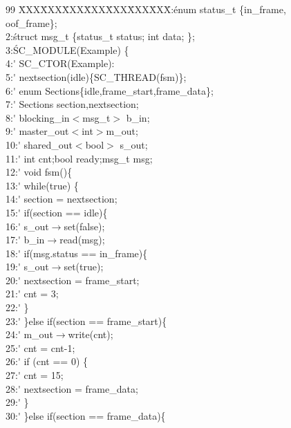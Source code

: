 \begin{figure}
  \centering  
  \begin{minipage}{0.9\linewidth}
    \sffamily\small
    \begin{tabbing}
99 \= XXX\=XXX\=XXX\=XXX\=XXX\=XXX\=XXX\=:\' enum status\_t \{in\_frame, oof\_frame\};\\
2:\' struct msg\_t \{status\_t status; int data; \};\\
3:\' SC\_MODULE(Example) \{ \\
4:\'\> SC\_CTOR(Example): \\
5:\'\>\> nextsection(idle)\{SC\_THREAD(fsm)\}; \\
6:\'\> enum Sections\{idle,frame\_start,frame\_data\}; \\
7:\'\> Sections section,nextsection; \\
8:\'\> blocking\_in$<$msg\_t$>$ b\_in; \\
9:\'\> master\_out$<$int$>$m\_out; \\
10:\'\> shared\_out$<$bool$>$ s\_out; \\
11:\'\> int cnt;bool ready;msg\_t msg; \\
12:\'\> void fsm()\{ \\
13:\'\>\> while(true) \{ \\
14:\'\>\>\> section = nextsection; \\
15:\'\>\>\> if(section == idle)\{ \\
16:\'\>\>\>\> s\_out$\rightarrow$set(false); \\
17:\'\>\>\>\> b\_in$\rightarrow$read(msg);\\
18:\'\>\>\>\> if(msg.status == in\_frame)\{\\
19:\'\>\>\>\>\> s\_out$\rightarrow$set(true); \\
20:\'\>\>\>\>\> nextsection = frame\_start;\\
21:\'\>\>\>\>\> cnt = 3;\\
22:\'\>\>\>\> \}\\
23:\'\>\>\> \}else if(section == frame\_start)\{ \\
24:\'\>\>\>\> m\_out$\rightarrow$write(cnt);\\
25:\'\>\>\>\> cnt = cnt-1;\\
26:\'\>\>\>\> if (cnt == 0) \{\\
27:\'\>\>\>\>\> cnt = 15;\\
28:\'\>\>\>\>\> nextsection = frame\_data;\\
29:\'\>\>\>\> \}\\
30:\'\>\>\> \}else if(section == frame\_data)\{ \\

\end{tabbing}
\end{minipage}
\end{figure}
